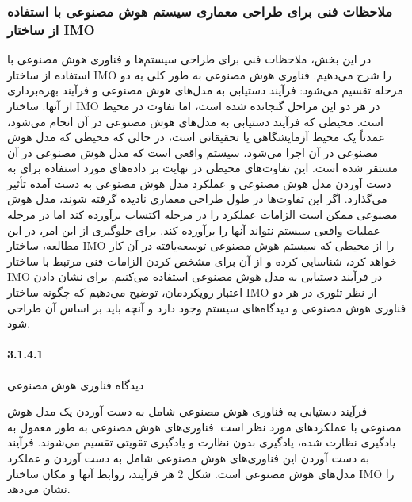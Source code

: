 \documentclass[a4paper,10pt]{article}
\begin{document}
        \subsubsection{ملاحظات فنی برای طراحی معماری سیستم هوش مصنوعی با استفاده از ساختار IMO}

            در این بخش، ملاحظات فنی برای طراحی سیستم‌ها و فناوری هوش مصنوعی با استفاده از ساختار IMO را شرح می‌دهیم. فناوری هوش مصنوعی به طور کلی به دو مرحله تقسیم می‌شود: فرآیند دستیابی به مدل‌های هوش مصنوعی و فرآیند بهره‌برداری از آنها. ساختار IMO در هر دو این مراحل گنجانده شده است، اما تفاوت در محیط است. محیطی که فرآیند دستیابی به مدل‌های هوش مصنوعی در آن انجام می‌شود، عمدتاً یک محیط آزمایشگاهی یا تحقیقاتی است، در حالی که محیطی که مدل هوش مصنوعی در آن اجرا می‌شود، سیستم واقعی است که مدل هوش مصنوعی در آن مستقر شده است. این تفاوت‌های محیطی در نهایت بر داده‌های مورد استفاده برای به دست آوردن مدل هوش مصنوعی و عملکرد مدل هوش مصنوعی به دست آمده تأثیر می‌گذارد. اگر این تفاوت‌ها در طول طراحی معماری نادیده گرفته شوند، مدل هوش مصنوعی ممکن است الزامات عملکرد را در مرحله اکتساب برآورده کند اما در مرحله عملیات واقعی سیستم نتواند آنها را برآورده کند. برای جلوگیری از این امر، در این مطالعه، ساختار IMO را از محیطی که سیستم هوش مصنوعی توسعه‌یافته در آن کار خواهد کرد، شناسایی کرده و از آن برای مشخص کردن الزامات فنی مرتبط با ساختار IMO در فرآیند دستیابی به مدل هوش مصنوعی استفاده می‌کنیم. برای نشان دادن اعتبار رویکردمان، توضیح می‌دهیم که چگونه ساختار IMO از نظر تئوری در هر دو فناوری هوش مصنوعی و دیدگاه‌های سیستم وجود دارد و آنچه باید بر اساس آن طراحی شود.

            \paragraph{3.1.4.1}{دیدگاه فناوری هوش مصنوعی}

                فرآیند دستیابی به فناوری هوش مصنوعی شامل به دست آوردن یک مدل هوش مصنوعی با عملکردهای مورد نظر است. فناوری‌های هوش مصنوعی به طور معمول به یادگیری نظارت شده، یادگیری بدون نظارت و یادگیری تقویتی تقسیم می‌شوند. فرآیند به دست آوردن این فناوری‌های هوش مصنوعی شامل به دست آوردن و عملکرد مدل‌های هوش مصنوعی است. شکل 2 هر فرآیند، روابط آنها و مکان ساختار IMO را نشان می‌دهد.
\end{document}
